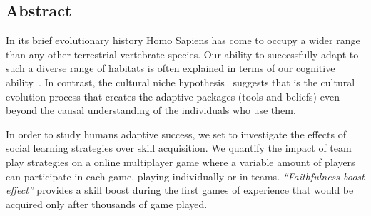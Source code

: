 \documentclass[a0,portrait]{a0poster}
\begin{document}
\begin{multicols}{2} %


\large

\section*{Abstract}
\justify 

In its brief evolutionary history Homo Sapiens has come to occupy a wider range than any other terrestrial vertebrate species.
Our ability to successfully adapt to such a diverse range of habitats is often explained in terms of our cognitive ability~\cite{pinker2010-cognitiveNiche,newell1981-skillAcquisitionAndLawOfPractice}.
In contrast, the cultural niche hypothesis~\cite{boyd2011-culturalNiche} suggests that is the cultural evolution process that creates the adaptive packages (tools and beliefs) even beyond the causal understanding of the individuals who use them.

In order to study humans adaptive success, we set to investigate the effects of social learning strategies over skill acquisition.
We quantify the impact of team play strategies on a online multiplayer game where a variable amount of players can participate in each game, playing individually or in teams.
\emph{``Faithfulness-boost effect''} provides a skill boost during the first games of experience that would be acquired only after thousands of game played.



\end{multicols}
\end{document}
